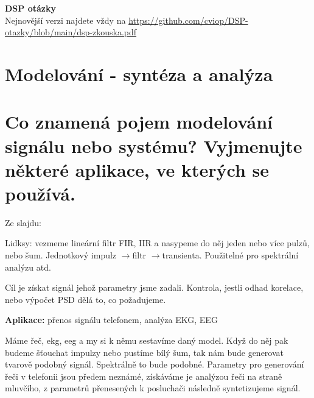 \documentclass[a4paper,12pt]{article}   %
\newcommand{\rrarr}{$\rightarrow$}
\begin{document}
\pagestyle{fancy}                                           %
\renewcommand{\headrulewidth}{0.5pt}                        %
\renewcommand{\footrulewidth}{0pt}                          %
\lhead{}        \rhead{}  %
\lfoot{ } \cfoot{ } \rfoot{ }                                  %

\begin{center}
    {\Large \textbf{DSP otázky}}\\
    {\normalfont Nejnovější verzi najdete vždy na \url{https://github.com/cviop/DSP-otazky/blob/main/dsp-zkouska.pdf}}\\
\end{center}





\tableofcontents
\newpage
{} %
\section*{Modelování - syntéza a analýza}
\section{Co znamená pojem modelování signálu nebo systému? Vyjmenujte některé aplikace, ve kterých se používá.}
Ze slajdu: 


Lidksy: vezmeme lineární filtr FIR, IIR a nasypeme do něj jeden nebo více pulzů, nebo šum. Jednotkový impulz \rrarr filtr \rrarr transienta. Použitelné pro spektrální analýzu atd. 

Cíl je získat signál jehož parametry jsme zadali. Kontrola, jestli odhad korelace, nebo výpočet PSD dělá to, co požadujeme.

\textbf{Aplikace:} přenos signálu telefonem, analýza EKG, EEG

Máme řeč, ekg, eeg a my si k němu sestavíme daný model. Když do něj pak budeme šťouchat impulzy nebo pustíme bílý šum, tak nám bude generovat tvarově podobný signál. Spektrálně to bude podobné. Parametry pro generování řeči v telefonii jsou předem neznámé, získáváme je analýzou řeči na straně mluvčího, z parametrů přenesených k posluchači následně syntetizujeme signál. 
\end{document}
